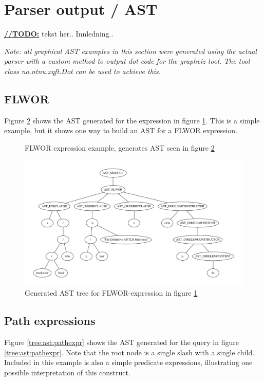 \section{Parser output / AST}
\label{sect:results:parser_output_ast}
\underline{\textbf{\LARGE //TODO:}} tekst her.. Innledning..

\emph{Note: all graphical AST examples in this section were generated using the
actual parser with a custom method to output dot code for the graphviz tool. The
tool class no.ntnu.xqft.Dot can be used to achieve this.}

\subsection{FLWOR}
Figure \ref{tree:ast:flwor1} shows the AST generated for the expression in
figure \ref{code:ast:flwor1}. This is a simple example, but it shows one way to
build an AST for a FLWOR expression.

\begin{figure}[h!]

\caption{FLWOR expression example, generates AST seen in figure \ref{tree:ast:flwor1}}
\label{code:ast:flwor1}
\end{figure}


\begin{figure}[h!]
\centering
 \includegraphics[width=1\textwidth]{img/graphs/flwor1}
\caption{Generated AST tree for FLWOR-expression in figure \ref{code:ast:flwor1}}
\label{tree:ast:flwor1}
\end{figure}

\subsection{Path expressions}
Figure \ref{tree:ast:pathexpr} shows the AST generated for the query in figure
\ref{tree:ast:pathexpr}. Note that the root node is a single slash with a
single child. Included in this example is also a simple predicate expressions,
illustrating one possible interpretation of this construct.

